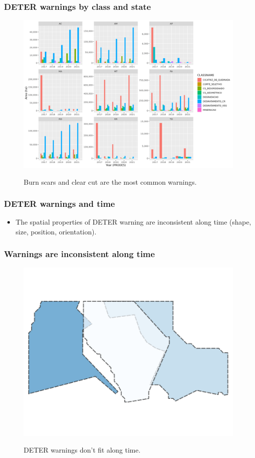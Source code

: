 \documentclass[aspectratio=169]{beamer}
\begin{document}
\begin{frame}
    \frametitle{DETER warnings by class and state}
    \begin{figure}[h]
        \includegraphics[width=0.65\linewidth]
        {./figures/plot_deter_area_by_class_state.png}
        \label{fig:deter_area_by_class_state}
        \caption{Burn scars and clear cut are the most common warnings.}
    \end{figure}
\end{frame}

\begin{frame}
    \frametitle{DETER warnings and time}
    \begin{itemize}
        \item The spatial properties of DETER warning are inconsistent along 
            time (shape, size, position, orientation).
    \end{itemize}
\end{frame}

\begin{frame}
    \frametitle{Warnings are inconsistent along time}
    \begin{figure}[h] 
        \includegraphics[width=0.60\linewidth]
        {./images/sample_deter_warnings.png}
        \label{fig:deter_subareas}
        \caption{DETER warnings don't fit along time.}
    \end{figure}
\end{frame}
\end{document}
